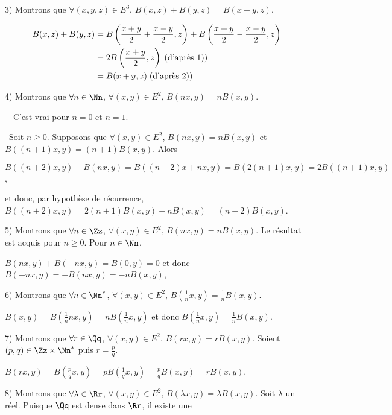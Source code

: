 {{3) Montrons que $\forall(x,y,z)\in E^3$, $B(x,z) + B(y,z) = B(x+y,z)$.

\begin{align*}\ensuremath
B(x,z) + B(y,z)&= B\left(\frac{x+y}{2}+\frac{x-y}{2},z\right)+ B\left(\frac{x+y}{2}-\frac{x-y}{2},z\right)\\
 &=2B\left(\frac{x+y}{2},z\right)\;(\text{d'après 1)})\\
 &= B(x+y,z)\;(\text{d'après 2)}).
\end{align*}

4) Montrons que $\forall n\in\Nn$, $\forall(x,y)\in E^2$, $B(nx,y) = nB(x,y)$.

\textbullet~~C'est vrai pour $n = 0$ et $n=1$.

\textbullet~Soit $n\geqslant0$. Supposons que $\forall(x,y)\in E^2$, $B(nx,y) = nB(x,y)$ et $B((n+1)x,y) = (n+1)B(x,y)$. Alors

\begin{center}
$B((n+2)x,y) + B(nx,y) = B((n+2)x+nx,y) = B(2(n+1)x,y) = 2B((n+1)x,y)$,
\end{center}

et donc, par hypothèse de récurrence, $B((n+2)x,y)=2(n+1)B(x,y)-nB(x,y) =(n+2)B(x,y)$.

5) Montrons que $\forall n\in\Zz$, $\forall(x,y)\in E^2$, $B(nx,y) = nB(x,y)$. Le résultat est acquis pour $n\geqslant 0$. Pour $n\in\Nn$,

\begin{center}
$B(nx,y) + B(-nx,y) = B(0,y) = 0$ et donc $B(-nx,y) =- B(nx,y)=-nB(x,y)$,
\end{center}

6) Montrons que $\forall n\in\Nn^*$, $\forall(x,y)\in E^2$, $B\left(\frac{1}{n}x,y\right) =\frac{1}{n}B(x,y)$.

\begin{center}
$B(x,y) =B\left(\frac{1}{n}nx,y\right) =nB\left(\frac{1}{n}x,y\right)$ et donc $B\left(\frac{1}{n}x,y\right) =\frac{1}{n}B(x,y)$.
\end{center}

7) Montrons que $\forall r\in\Qq$, $\forall(x,y)\in E^2$, $B(rx,y) = rB(x,y)$. Soient $(p,q)\in\Zz\times\Nn^*$ puis $r=\frac{p}{q}$.

\begin{center}
$B(rx,y) = B\left(\frac{p}{q}x,y\right) =pB\left(\frac{1}{q}x,y\right)=\frac{p}{q}B(x,y) = rB(x,y)$.
\end{center}

8) Montrons que $\forall\lambda\in\Rr$, $\forall(x,y)\in E^2$, $B(\lambda x,y) =\lambda B(x,y)$. Soit $\lambda$ un réel. Puisque $\Qq$ est dense dans $\Rr$, il existe une

}}
